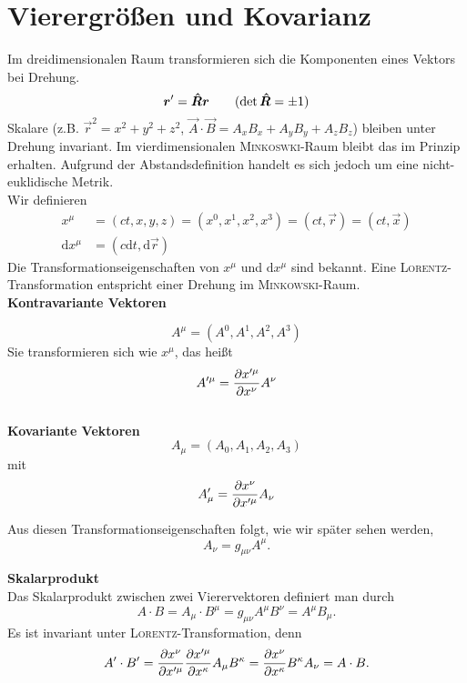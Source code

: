 \section{Vierergrößen und Kovarianz}

Im dreidimensionalen Raum transformieren sich die Komponenten eines Vektors bei Drehung.
\begin{equation*}
\bm{r}'=\bm{\hat{R}}\bm{r} \qquad (\det\bm{\hat{R}}=\pm 1)
\end{equation*}
Skalare (z.B. $\vec{r}^2=x^2+y^2+z^2$, $\vec{A}\cdot\vec{B}=A_xB_x+A_yB_y+A_zB_z$) bleiben unter Drehung invariant. Im vierdimensionalen \textsc{Minkoswki}-Raum bleibt das im Prinzip erhalten. Aufgrund der Abstandsdefinition handelt es sich jedoch um eine nicht-euklidische Metrik.\\
Wir definieren
\begin{align*}
x^\mu &= (ct,x,y,z)=(x^0,x^1,x^2,x^3)=(ct,\vec{r})=(ct,\vec{x})\\
\mathrm{d}x^\mu & = (c\mathrm{d}t,\mathrm{d}\vec{r})
\end{align*}
Die Transformationseigenschaften von $x^\mu$ und $\mathrm{d}x^\mu$ sind bekannt. Eine \textsc{Lorentz}-Transformation entspricht einer Drehung im \textsc{Minkowski}-Raum.\\

\textbf{Kontravariante Vektoren}

\begin{equation*}
A^\mu = (A^0,A^1,A^2,A^3)
\end{equation*}
Sie transformieren sich wie $x^\mu$, das heißt
\begin{equation*}
A'^\mu =\frac{\partial{x'^\mu}}{\partial{x^\nu}}A^\nu
\end{equation*}
\ \\

\textbf{Kovariante Vektoren}
\begin{equation*}
A_\mu=(A_0,A_1,A_2,A_3)
\end{equation*}
mit
\begin{equation*}
A_\mu'=\frac{\partial{x^\nu}}{\partial{x'^\mu}}A_\nu
\end{equation*}

Aus diesen Transformationseigenschaften folgt, wie wir später sehen werden,
\begin{equation*}
A_\nu = g_{\mu\nu}A^\mu.
\end{equation*}

\textbf{Skalarprodukt}\\

Das Skalarprodukt zwischen zwei Vierervektoren definiert man durch
\begin{equation*}
A\cdot B = A_\mu\cdot B^\mu = g_{\mu\nu}A^\mu B^\nu = A^\mu B_\mu.
\end{equation*}
Es ist invariant unter \textsc{Lorentz}-Transformation, denn
\begin{equation*}
A'\cdot B' = \frac{\partial{x^\nu}}{\partial{x'^\mu}}\frac{\partial{x'^\mu}}{\partial{x^\kappa}} A_\mu B^\kappa = \frac{\partial{x^\nu}}{\partial{x^\kappa}}B^\kappa A_\nu = A\cdot B.
\end{equation*}

